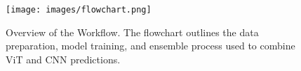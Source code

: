 \begin{figure}
\centerline{\texttt{[image: images/flowchart.png]}}
\caption{Overview of the \ENACT Workflow. The flowchart outlines the data preparation, model training, and ensemble process used to combine ViT and CNN predictions.}
\vspace{-1em}
\label{fig:flowchart}
\end{figure}